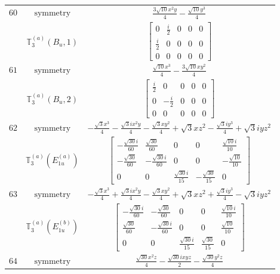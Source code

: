 \documentclass[fleqn,8pt,landscape]{jsarticle}
\begin{document}
\begin{longtable}{ccc}
$ 60 $ & $ \text{symmetry} $ & $ \frac{3 \sqrt{10} x^{2} y}{4} - \frac{\sqrt{10} y^{3}}{4} $ \\
$  $ & $ \mathbb{T}_{3}^{(a)}(B_{u},1) $ & $ \begin{bmatrix} 0 & \frac{i}{2} & 0 & 0 & 0 \\ \frac{i}{2} & 0 & 0 & 0 & 0 \\ 0 & 0 & 0 & 0 & 0 \end{bmatrix} $ \\ \hline
$ 61 $ & $ \text{symmetry} $ & $ \frac{\sqrt{10} x^{3}}{4} - \frac{3 \sqrt{10} x y^{2}}{4} $ \\
$  $ & $ \mathbb{T}_{3}^{(a)}(B_{u},2) $ & $ \begin{bmatrix} \frac{i}{2} & 0 & 0 & 0 & 0 \\ 0 & - \frac{i}{2} & 0 & 0 & 0 \\ 0 & 0 & 0 & 0 & 0 \end{bmatrix} $ \\ \hline
$ 62 $ & $ \text{symmetry} $ & $ - \frac{\sqrt{3} x^{3}}{4} - \frac{\sqrt{3} i x^{2} y}{4} - \frac{\sqrt{3} x y^{2}}{4} + \sqrt{3} x z^{2} - \frac{\sqrt{3} i y^{3}}{4} + \sqrt{3} i y z^{2} $ \\
$  $ & $ \mathbb{T}_{3}^{(a)}(E_{1u}^{(a)}) $ & $ \begin{bmatrix} - \frac{\sqrt{30} i}{60} & \frac{\sqrt{30}}{60} & 0 & 0 & \frac{\sqrt{10} i}{10} \\ - \frac{\sqrt{30}}{60} & - \frac{\sqrt{30} i}{60} & 0 & 0 & - \frac{\sqrt{10}}{10} \\ 0 & 0 & \frac{\sqrt{30} i}{15} & - \frac{\sqrt{30}}{15} & 0 \end{bmatrix} $ \\ \hline
$ 63 $ & $ \text{symmetry} $ & $ - \frac{\sqrt{3} x^{3}}{4} + \frac{\sqrt{3} i x^{2} y}{4} - \frac{\sqrt{3} x y^{2}}{4} + \sqrt{3} x z^{2} + \frac{\sqrt{3} i y^{3}}{4} - \sqrt{3} i y z^{2} $ \\
$  $ & $ \mathbb{T}_{3}^{(a)}(E_{1u}^{(b)}) $ & $ \begin{bmatrix} - \frac{\sqrt{30} i}{60} & - \frac{\sqrt{30}}{60} & 0 & 0 & \frac{\sqrt{10} i}{10} \\ \frac{\sqrt{30}}{60} & - \frac{\sqrt{30} i}{60} & 0 & 0 & \frac{\sqrt{10}}{10} \\ 0 & 0 & \frac{\sqrt{30} i}{15} & \frac{\sqrt{30}}{15} & 0 \end{bmatrix} $ \\ \hline
$ 64 $ & $ \text{symmetry} $ & $ \frac{\sqrt{30} x^{2} z}{4} - \frac{\sqrt{30} i x y z}{2} - \frac{\sqrt{30} y^{2} z}{4} $ \\

\end{longtable}
\end{document}
